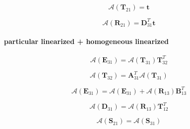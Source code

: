 \begin{equation}
\mathcal{A}(\mathbf{T}_{21}) = \mathbf{t}
\label{eq:adding-upward-adjoint_of_tangent_linear-homogeneous_linearized_p_unlinearized-T21_a}
\end{equation}

\begin{equation}
\mathcal{A}(\mathbf{R}_{21}) = \mathbf{D}^{T}_{31}\mathbf{t}
\label{eq:adding-upward-adjoint_of_tangent_linear-homogeneous_linearized_p_unlinearized-R21_a}
\end{equation}


\paragraph{particular linearized + homogeneous linearized}
\label{sec:adding-upward-adjoint_of_tangent_linear-particular_linearized_p_homogeneous_linearized}

\begin{equation}
\mathcal{A}(\mathbf{E}_{31}) = \mathcal{A}(\mathbf{T}_{31})\mathbf{T}^{T}_{32}
\label{eq:adding-upward-adjoint_of_tangent_linear-particular_linearized_p_homogeneous_linearized-E31_a}
\end{equation}

\begin{equation}
\mathcal{A}(\mathbf{T}_{32}) = \mathbf{A}^{T}_{31}\mathcal{A}(\mathbf{T}_{31})
\label{eq:adding-upward-adjoint_of_tangent_linear-particular_linearized_p_homogeneous_linearized-T32_a}
\end{equation}

\begin{equation}
\mathcal{A}(\mathbf{E}_{31}) = \mathcal{A}(\mathbf{E}_{31}) + \mathcal{A}(\mathbf{R}_{13})\mathbf{B}^{T}_{13}
\label{eq:adding-upward-adjoint_of_tangent_linear-particular_linearized_p_homogeneous_linearized-E31_a2}
\end{equation}

\begin{equation}
\mathcal{A}(\mathbf{D}_{31}) = \mathcal{A}(\mathbf{R}_{13})\mathbf{T}^{T}_{12}
\label{eq:adding-upward-adjoint_of_tangent_linear-particular_linearized_p_homogeneous_linearized-D31_a}
\end{equation}

\begin{equation}
\mathcal{A}(\mathbf{S}_{21}) = \mathcal{A}(\mathbf{S}_{31})
\label{eq:adding-upward-adjoint_of_tangent_linear-particular_linearized_p_homogeneous_linearized-S31_a}
\end{equation}

